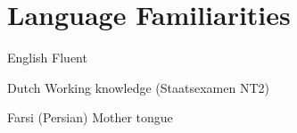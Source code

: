 \section{Language Familiarities}
\begin{CV}
\item [English] Fluent
\item [Dutch] Working knowledge (Staatsexamen NT2)
\item [Farsi (Persian)] Mother tongue
\end{CV}
